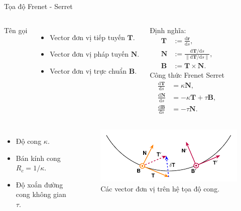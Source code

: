 \begin{frame}{Tọa độ Frenet - Serret}
    \begin{columns}
            Tên gọi
            \begin{itemize}
                \item Vector đơn vị tiếp tuyến \(\mathbf{T}\).
                \item Vector đơn vị pháp tuyến \(\mathbf{N}\).
                \item Vector đơn vị trực chuẩn \(\mathbf{B}\).
            \end{itemize}
            Định nghĩa:
            \begin{align}
                \mathbf{T} & := \frac{\mathrm{d} \mathbf{r}}{\mathrm{d} s}, \\
                \mathbf{N} & := \frac{\mathrm{d} \mathbf{T} / \mathrm{d} s}{\left\| \mathrm{d} \mathbf{T} / \mathrm{d} s \right\|}, \\
                \mathbf{B} & := \mathbf{T} \times \mathbf{N}.
            \end{align}
            Công thức Frenet Serret
            \begin{align}
                \frac{\mathrm{d} \mathbf{T}}{\mathrm{d} s} &= \kappa \mathbf{N}, \\
                \frac{\mathrm{d} \mathbf{N}}{\mathrm{d} s} &= - \kappa \mathbf{T} + \tau \mathbf{B}, \\
                \frac{\mathrm{d} \mathbf{B}}{\mathrm{d} s} &= - \tau \mathbf{N}.
            \end{align}
    \end{columns}
    \begin{columns}
        \begin{itemize}
            \item Độ cong \(\kappa\).
            \item Bán kính cong \(R_c = 1/\kappa\).
            \item Độ xoắn đường cong không gian \(\tau\).
        \end{itemize}
        \vspace{-2mm}
        \begin{figure}
            \centering
            \includegraphics[width=0.7\linewidth]{Figures/Frenet_Serret.pdf}
            \vspace{-2mm}
            \caption{Các vector đơn vị trên hệ tọa độ cong.}
            \label{fig:Frenet_Serret}
        \end{figure}
    \end{columns}
\end{frame}

